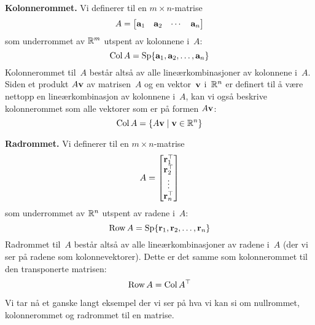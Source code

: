 \medskip\noindent\textbf{Kolonnerommet. }%
Vi definerer  til en $m \times n$-matrise
\[
A = \begin{bmatrix} \mathbf{a}_1 & \mathbf{a}_2 & \cdots & \mathbf{a}_n \end{bmatrix}
\]
som underrommet av $\mathbb{R}^m$ utspent av kolonnene i~$A$:
\[
\operatorname{Col} A = \operatorname{Sp} \{ \mathbf{a}_1, \mathbf{a}_2, \ldots, \mathbf{a}_n \}
\]
Kolonnerommet til~$A$ består altså av alle lineærkombinasjoner av
kolonnene i~$A$.  Siden et produkt $A \mathbf{v}$ av matrisen~$A$ og en
vektor~$\mathbf{v}$ i~$\mathbb{R}^n$ er definert til å være nettopp en
lineærkombinasjon av kolonnene i~$A$, kan vi også beskrive
kolonnerommet som alle vektorer som er på formen $A \mathbf{v}$:
\[
\operatorname{Col} A = \{ A \mathbf{v} \mid \mathbf{v} \in \mathbb{R}^n \}
\]

\medskip\noindent\textbf{Radrommet. }%
Vi definerer  til en $m \times n$-matrise
\[
A = \begin{bmatrix} \mathbf{r}_1^\top \\ \mathbf{r}_2^\top \\ \vdots \\ \mathbf{r}_n^\top \end{bmatrix}
\]
som underrommet av $\mathbb{R}^n$ utspent av radene i~$A$:
\[
\operatorname{Row} A = \operatorname{Sp} \{ \mathbf{r}_1, \mathbf{r}_2, \ldots, \mathbf{r}_n \}
\]
Radrommet til~$A$ består altså av alle lineærkombinasjoner av radene
i~$A$ (der vi ser på radene som kolonnevektorer).  Dette er det samme
som kolonnerommet til den transponerte matrisen:
\[
\operatorname{Row} A = \operatorname{Col} A^\top
\]

Vi tar nå et ganske langt eksempel der vi ser på hva vi kan si om
nullrommet, kolonnerommet og rad\-rommet til en matrise.

